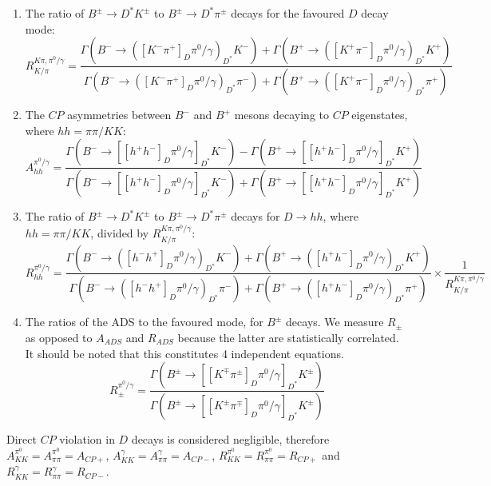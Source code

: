 \documentclass[oneside,12pt]{article}
\begin{document}
\begin{enumerate}
  \item The ratio of $B^{\pm} \rightarrow D^* K^{\pm}$ to $B^{\pm} \rightarrow
  D^* \pi^{\pm}$ decays for the favoured $D$ decay mode:
  \begin{equation}
    R^{K\pi , \pi^0 /\gamma}_{K/\pi}=\frac{\Gamma(B^{-}\rightarrow
    ([K^{-}\pi^{+}]_D\pi^0 /\gamma)_{D^*}K^{-})+\Gamma(B^{+}\rightarrow
    ([K^{+}\pi^{-}]_D\pi^0 /\gamma)_{D^*}K^{+})}{\Gamma(B^{-}\rightarrow
    ([K^{-}\pi^{+}]_D\pi^0 /\gamma)_{D^*}\pi^{-})+\Gamma(B^{+}\rightarrow
    ([K^{+}\pi^{-}]_D\pi^0 /\gamma)_{D^*}\pi^{+})}
	\label{eq:R_DstK_Dstpi}
  \end{equation}
  \item The $CP$ asymmetries between $B^{-}$ and $B^{+}$ mesons decaying to $CP$
  eigenstates, where $hh=\pi \pi /KK$:
		\begin{equation}
      A_{hh}^{\pi^{0}/\gamma}=\frac{\Gamma(B^{-}\rightarrow
      [[h^{+}h^{-}]_{D}\pi^{0}/\gamma]_{D^{*}}K^{-})-\Gamma(B^{+}\rightarrow
      [[h^{+}h^{-}]_{D}\pi^{0}/\gamma]_{D^{*}}K^{+})}{\Gamma(B^{-}\rightarrow
      [[h^{+}h^{-}]_{D}\pi^{0}/\gamma]_{D^{*}}K^{-})+\Gamma(B^{+}\rightarrow
      [[h^{+}h^{-}]_{D}\pi^{0}/\gamma]_{D^{*}}K^{+})} \label{eq:Aglw}
		\end{equation}
  \item The ratio of $B^{\pm} \rightarrow D^* K^{\pm}$ to $B^{\pm} \rightarrow
  D^* \pi^{\pm}$ decays for $D\rightarrow hh$, where $hh=\pi \pi /KK$, divided
  by $R^{K\pi , \pi^0 /\gamma}_{K/\pi}$:
		\begin{equation}
      R_{hh}^{\pi^{0}/\gamma}=\frac{\Gamma(B^{-}\rightarrow
      ([h^{-}h^{+}]_D\pi^0 /\gamma)_{D^*}K^{-})+\Gamma(B^{+}\rightarrow
      ([h^{+}h^{-}]_D\pi^0 /\gamma)_{D^*}K^{+})}{\Gamma(B^{-}\rightarrow
      ([h^{-}h^{+}]_D\pi^0 /\gamma)_{D^*}\pi^{-})+\Gamma(B^{+}\rightarrow
      ([h^{+}h^{-}]_D\pi^0 /\gamma)_{D^*}\pi^{+})} \times \frac{1}{R^{K\pi ,
      \pi^0 /\gamma}_{K/\pi}}
		\end{equation}
  \item The ratios of the ADS to the favoured mode, for $B^{\pm}$ decays. We
  measure $R_{\pm}$ as opposed to $A_{ADS}$ and $R_{ADS}$ because the latter are
  statistically correlated. It should be noted that this constitutes 4
  independent equations.
		\begin{equation}
			R_{\pm}^{\pi^{0}/\gamma}=\frac{\Gamma(B^{\pm}\rightarrow
			[[K^{\mp}\pi^{\pm}]_{D}\pi^{0}/\gamma]_{D^{*}}K^{\pm})}{\Gamma(B^{\pm}\rightarrow
			[[K^{\pm}\pi^{\mp}]_{D}\pi^{0}/\gamma]_{D^{*}}K^{\pm})} \label{eq:Rads}
		\end{equation}
\end{enumerate}
\noindent Direct $CP$ violation in $D$ decays is considered negligible, therefore
$A_{KK}^{\pi^{0}}=A_{\pi\pi}^{\pi^{0}}=A_{CP+}$,
$A_{KK}^{\gamma}=A_{\pi\pi}^{\gamma}=A_{CP-}$,
$R_{KK}^{\pi^{0}}=R_{\pi\pi}^{\pi^{0}}=R_{CP+}$ and
$R_{KK}^{\gamma}=R_{\pi\pi}^{\gamma}=R_{CP-}$.
\end{document}
